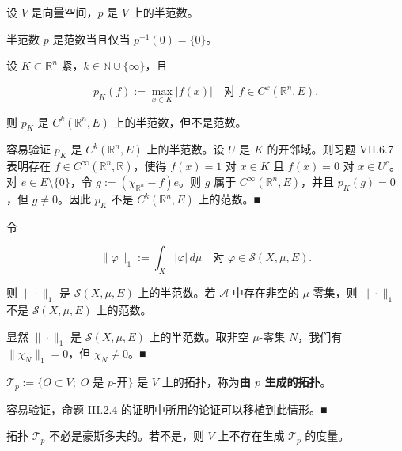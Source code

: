 \begin{remark}

设 $ V $ 是向量空间，$ p $ 是 $ V $ 上的半范数。

\begin{items}
\item

半范数 $ p $ 是范数当且仅当 $ p^{-1}(0) = \{0\} $。

\item

设 $ K \subset \mathbb{R}^n $ 紧，$ k \in \mathbb{N} \cup \{\infty\} $，且

\[
p_K(f) := \max_{x \in K} |f(x)| \quad \text{对 } f \in C^{k}(\mathbb{R}^n, E) .
\]

则 $ p_K $ 是 $ C^{k}(\mathbb{R}^n, E) $ 上的半范数，但不是范数。

\proofhead
容易验证 $ p_K $ 是 $ C^{k}(\mathbb{R}^n, E) $ 上的半范数。设 $ U $ 是 $ K $ 的开邻域。则习题 VII.6.7 表明存在 $ f \in C^{\infty}(\mathbb{R}^n, \mathbb{R}) $，使得 $ f(x) = 1 $ 对 $ x \in K $ 且 $ f(x) = 0 $ 对 $ x \in U^{c} $。对 $ e \in E \setminus \{0\} $，令 $ g := (\chi_{\mathbb{R}^n} - f)e $。则 $ g $ 属于 $ C^{\infty}(\mathbb{R}^n, E) $，并且 $ p_K(g) = 0 $，但 $ g \ne 0 $。因此 $ p_K $ 不是 $ C^{k}(\mathbb{R}^n, E) $ 上的范数。\nobreak\hspace{0.35em}■
\item

令

\[
\|\varphi\|_1 := \int_X |\varphi| \, d\mu \quad \text{对 } \varphi \in \mathcal{S}(X,\mu,E) .
\]

则 $ \|\cdot\|_1 $ 是 $ \mathcal{S}(X,\mu,E) $ 上的半范数。若 $ \mathcal{A} $ 中存在非空的 $ \mu $-零集，则 $ \|\cdot\|_1 $ 不是 $ \mathcal{S}(X,\mu,E) $ 上的范数。

\proofhead
显然 $ \|\cdot\|_1 $ 是 $ \mathcal{S}(X,\mu,E) $ 上的半范数。取非空 $ \mu $-零集 $ N $，我们有 $ \|\chi_N\|_1 = 0 $，但 $ \chi_N \ne 0 $。\nobreak\hspace{0.35em}■
\item

$ \mathcal{T}_p := \{ O \subset V ; \; O \text{ 是 } p\text{-开} \} $ 是 $ V $ 上的拓扑，称为\textbf{由 $ p $ 生成的拓扑}。

\proofhead
容易验证，命题 III.2.4 的证明中所用的论证可以移植到此情形。\nobreak\hspace{0.35em}■
\item

拓扑 $ \mathcal{T}_p $ 不必是豪斯多夫的。若不是，则 $ V $ 上不存在生成 $ \mathcal{T}_p $ 的度量。


\end{items}
\end{remark}
